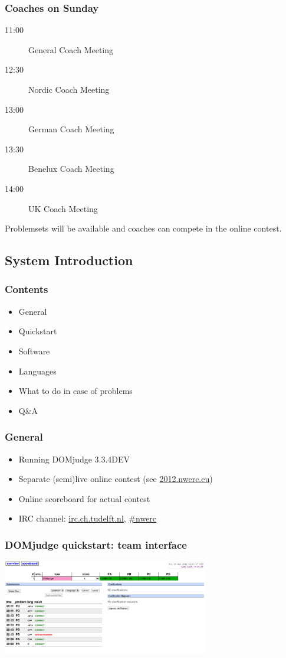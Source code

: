 \documentclass[t]{beamer}
\begin{document}
\begin{frame}
	\frametitle{Coaches on Sunday}
	\begin{description}
		\item[11:00] General Coach Meeting
		\item[12:30] Nordic Coach Meeting
		\item[13:00] German Coach Meeting
		\item[13:30] Benelux Coach Meeting 
		\item[14:00] UK Coach Meeting
	\end{description}
	Problemsets will be available and coaches can compete in the online contest.
\end{frame}
\subsection{System Introduction}
\begin{frame}
	\frametitle{Contents}
		\begin{itemize}
		\item General
		\item Quickstart
		\item Software
		\item Languages
		\item What to do in case of problems
		\item Q\&A
	\end{itemize}
\end{frame}
\begin{frame}[fragile]
\frametitle{General}
	\begin{itemize}
		\item Running DOMjudge 3.3.4DEV
		\item Separate (semi)live online contest (see \url{2012.nwerc.eu})
		\item Online scoreboard for actual contest
		\item IRC channel: \url{irc.ch.tudelft.nl}, \url{#nwerc}
	\end{itemize}
\end{frame}
\begin{frame}
	\frametitle{DOMjudge quickstart: team interface}
	\includegraphics[width=90mm]{teaminterface.png}
	\end{frame}
\end{document}
